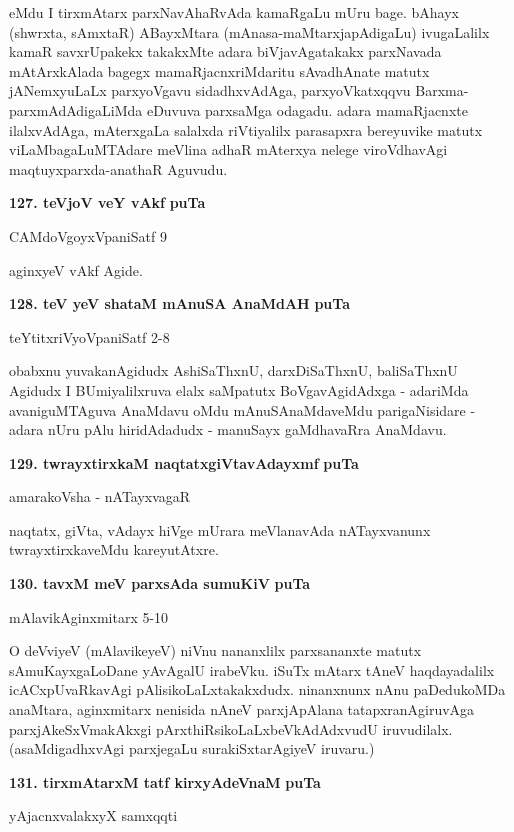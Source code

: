 eMdu I tirxmAtarx parxNavAhaRvAda kamaRgaLu mUru bage. bAhayx (shwrxta, sAmxtaR) ABayxMtara (mAnasa-maMtarxjapAdigaLu) ivugaLalilx kamaR savxrUpakekx takakxMte adara biVjavAgatakakx parxNavada mAtArxkAlada bagegx mamaRjacnxriMdaritu sAvadhAnate matutx jANemxyuLaLx parxyoVgavu sidadhxvAdAga, parxyoVkatxqqvu Barxma-parxmAdAdigaLiMda eDuvuva parxsaMga odagadu. adara mamaRjacnxte ilalxvAdAga, mAterxgaLa salalxda riVtiyalilx parasapxra bereyuvike matutx viLaMbagaLuMTAdare meVlina adhaR mAterxya nelege viroVdhavAgi maqtuyxparxda-anathaR Aguvudu.

\medskip
\noindent
\textbf{127. teVjoV veY vAkf} \hfill{\bf puTa \pageref{212}}

\hfill{CAMdoVgoyxVpaniSatf 9}

aginxyeV vAkf Agide.

\medskip
\noindent
\textbf{128. teV yeV shataM mAnuSA AnaMdAH} \hfill{\bf puTa \pageref{166}}

\hfill{teYtitxriVyoVpaniSatf 2-8}

obabxnu yuvakanAgidudx AshiSaThxnU, darxDiSaThxnU, baliSaThxnU Agidudx I BUmiyalilxruva elalx saMpatutx BoVgavAgidAdxga - adariMda avaniguMTAguva AnaMdavu oMdu mAnuSAnaMdaveMdu parigaNisidare - adara nUru pAlu hiridAdadudx - manuSayx gaMdhavaRra AnaMdavu.

\eject

\noindent
\textbf{129. twrayxtirxkaM naqtatxgiVtavAdayxmf} \hfill{\bf puTa \pageref{241b}}

\hfill{amarakoVsha - nATayxvagaR}

\smallskip
naqtatx, giVta, vAdayx hiVge mUrara meVlanavAda nATayxvanunx twrayxtirxkaveMdu kareyutAtxre.

\medskip
\noindent
\textbf{130. tavxM meV parxsAda sumuKiV} \hfill{\bf puTa \pageref{244}}

\hfill{mAlavikAginxmitarx 5-10}

\smallskip
O deVviyeV (mAlavikeyeV) niVnu nananxlilx parxsananxte matutx sAmuKayxgaLoDane yAvAgalU irabeVku. iSuTx mAtarx tAneV haqdayadalilx icACxpUvaRkavAgi pAlisikoLaLxtakakxdudx. ninanxnunx nAnu paDedukoMDa anaMtara, aginxmitarx nenisida nAneV parxjApAlana tatapxranAgiruvAga parxjAkeSxVmakAkxgi pArxthiRsikoLaLxbeVkAdAdxvudU iruvudilalx. (asaMdigadhxvAgi parxjegaLu surakiSxtarAgiyeV iruvaru.)

\medskip
\noindent
\textbf{131. tirxmAtarxM tatf kirxyAdeVnaM} \hfill{\bf puTa \pageref{147e}}

\hfill{yAjacnxvalakxyX samxqqti}

